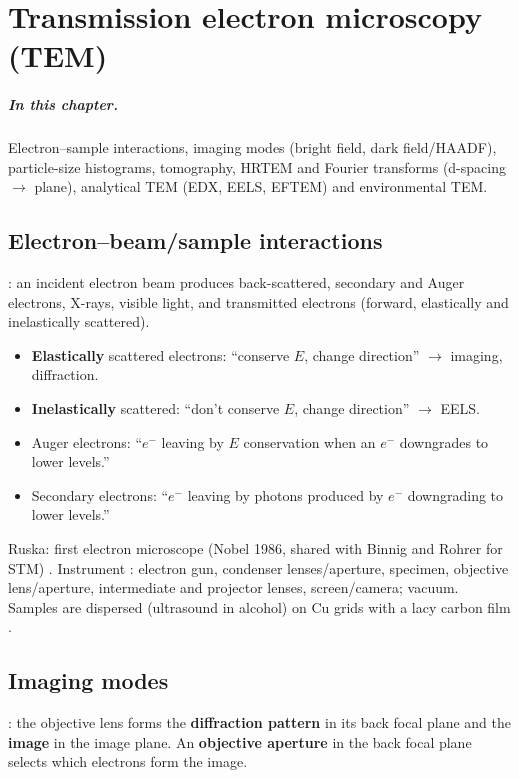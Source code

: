 \chapter{Transmission electron microscopy (TEM)}
\label{ch:tem}

\paragraph{In this chapter.} Electron--sample interactions, imaging modes (bright field, dark field/HAADF), particle-size
histograms, tomography, HRTEM and Fourier transforms (d-spacing $\to$ plane), analytical TEM (EDX, EELS, EFTEM) and
environmental TEM.

\section{Electron--beam/sample interactions}
: an incident electron beam produces back-scattered, secondary and Auger electrons, X-rays, visible light,
and transmitted electrons (forward, elastically and inelastically scattered).
\begin{classbox}
\begin{itemize}
  \item \textbf{Elastically} scattered electrons: ``conserve $E$, change direction'' $\to$ imaging, diffraction.
  \item \textbf{Inelastically} scattered: ``don't conserve $E$, change direction'' $\to$ EELS.
  \item Auger electrons: ``$e^-$ leaving by $E$ conservation when an $e^-$ downgrades to lower levels.''
  \item Secondary electrons: ``$e^-$ leaving by photons produced by $e^-$ downgrading to lower levels.''
\end{itemize}
\end{classbox}
Ruska: first electron microscope (Nobel 1986, shared with Binnig and Rohrer for STM) .
Instrument : electron gun, condenser lenses/aperture, specimen, objective lens/aperture, intermediate and
projector lenses, screen/camera; vacuum. Samples are dispersed (ultrasound in alcohol) on Cu grids with a lacy
carbon film .

\section{Imaging modes}
: the objective lens forms the \textbf{diffraction pattern} in its back focal plane and the \textbf{image}
in the image plane. An \textbf{objective aperture} in the back focal plane selects which electrons form the image.

